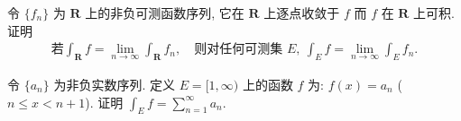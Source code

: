 \documentclass[../../main.tex]{subfiles}
\begin{document}
\begin{exercise}\label{exercise:ch04-22}
令 $\{f_{n}\}$ 为 $\mathbf{R}$ 上的非负可测函数序列, 它在 $\mathbf{R}$ 上逐点收敛于 $f$ 而 $f$ 在 $\mathbf{R}$ 上可积. 证明
\begin{align*}
\text{若}\int_{\mathbf{R}}f=\lim_{n\to\infty}\int_{\mathbf{R}}f_{n},\quad\text{则对任何可测集 }E,\ \int_{E}f=\lim_{n\to\infty}\int_{E}f_{n}.
\end{align*}
\end{exercise}

\begin{exercise}\label{exercise:ch04-23}
令 $\{a_{n}\}$ 为非负实数序列. 定义 $E=[1,\infty)$ 上的函数 $f$ 为: $f(x)=a_{n}$ ($n\leqslant x<n+1$). 证明 $\int_{E}f=\sum_{n=1}^{\infty}a_{n}$.
\end{exercise}
\end{document}
